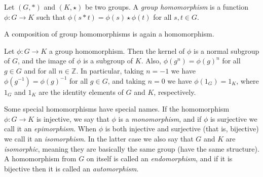 \documentclass[12pt]{article}
\def\Z{\mathbb{Z}}
\begin{document}

Let $(G,\ast)$ and $(K,\star)$ be two groups.  A \emph{group homomorphism} is a
function $\phi\colon G \to K$ such that
$\phi (s \ast t) = \phi(s) \star \phi(t)$ for all $s,t \in G$.

A composition of group homomorphisms is again a homomorphism.

Let $\phi\colon G\to K$ a group homomorphism.
Then the kernel of $\phi$ is a normal subgroup of $G$,
and the image of $\phi$ is a subgroup of $K$.
Also, $\phi(g^n)=\phi(g)^n$ for all $g\in G$ and for all $n \in\Z$.
In particular,
taking $n=-1$ we have $\phi(g^{-1})=\phi(g)^{-1}$ for all $g \in G$,
and taking $n=0$ we have $\phi(1_G)=1_K$,
where $1_G$ and $1_K$ are the identity elements of $G$ and $K$,
respectively.

Some special homomorphisms have special names.
If the homomorphism $\phi\colon G\to K$ is injective,
we say that $\phi$ is a \emph{monomorphism},
and if $\phi$ is surjective we call it an \emph{epimorphism}.
When $\phi$ is both injective and surjective (that is, bijective) we call it an \emph{isomorphism}.
In the latter case we also say that $G$ and $K$ are \emph{isomorphic}, meaning they are basically the same group (have the same structure).
A homomorphism from $G$ on itself is called an \emph{endomorphism},
and if it is bijective then it is called an \emph{automorphism}.
\end{document}
